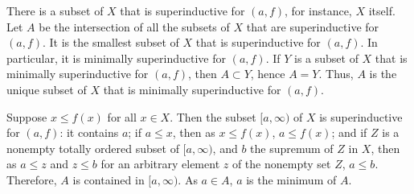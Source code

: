 \documentclass{article}
\begin{document}
\begin{solution}[\ref{exe:8yw1mw3a}]
  \label{sol:iyf7ad62}
  There is a subset of \(X\) that is superinductive for \((a, f)\),
  for instance, \(X\) itself.  Let \(A\) be the intersection of all
  the subsets of \(X\) that are superinductive for \((a, f)\).  It is
  the smallest subset of \(X\) that is superinductive for \((a, f)\).
  In particular, it is minimally superinductive for \((a, f)\).  If
  \(Y\) is a subset of \(X\) that is minimally superinductive for
  \((a, f)\), then \(A \subset Y\), hence \(A = Y\).  Thus, \(A\) is
  the unique subset of \(X\) that is minimally superinductive for
  \((a, f)\).

  Suppose \(x \leq f(x)\) for all \(x \in X\).  Then the subset
  \([a, \infty)\) of \(X\) is superinductive for \((a, f)\): it
  contains \(a\); if \(a \leq x\), then as \(x \leq f(x)\),
  \(a \leq f(x)\); and if \(Z\) is a nonempty totally ordered subset
  of \([a, \infty)\), and \(b\) the supremum of \(Z\) in \(X\), then
  as \(a \leq z\) and \(z \leq b\) for an arbitrary element \(z\) of
  the nonempty set \(Z\), \(a \leq b\).  Therefore, \(A\) is contained
  in \([a, \infty)\).  As \(a \in A\), \(a\) is the minimum of \(A\).
\end{solution}
\end{document}

